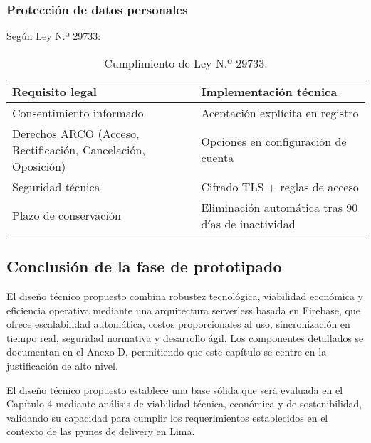 \subsubsection{Protección de datos personales}

Según Ley N.º 29733:

\begin{table}[H]
\centering
\caption{Cumplimiento de Ley N.º 29733.}
\label{tab:cumplimiento_ley}
\begin{tabular}{@{}p{5.5cm}p{7.5cm}@{}}
\toprule
\textbf{Requisito legal} & \textbf{Implementación técnica} \\
\midrule
Consentimiento informado & Aceptación explícita en registro \\
\midrule
Derechos ARCO (Acceso, Rectificación, Cancelación, Oposición) & Opciones en configuración de cuenta \\
\midrule
Seguridad técnica & Cifrado TLS + reglas de acceso \\
\midrule
Plazo de conservación & Eliminación automática tras 90 días de inactividad \\
\bottomrule
\end{tabular}
\end{table}

\subsection{Conclusión de la fase de prototipado}

El diseño técnico propuesto combina robustez tecnológica, viabilidad económica y eficiencia operativa mediante una arquitectura serverless basada en Firebase, que ofrece escalabilidad automática, costos proporcionales al uso, sincronización en tiempo real, seguridad normativa y desarrollo ágil. Los componentes detallados se documentan en el Anexo D, permitiendo que este capítulo se centre en la justificación de alto nivel.

El diseño técnico propuesto establece una base sólida que será evaluada en el Capítulo 4 mediante análisis de viabilidad técnica, económica y de sostenibilidad, validando su capacidad para cumplir los requerimientos establecidos en el contexto de las pymes de delivery en Lima.